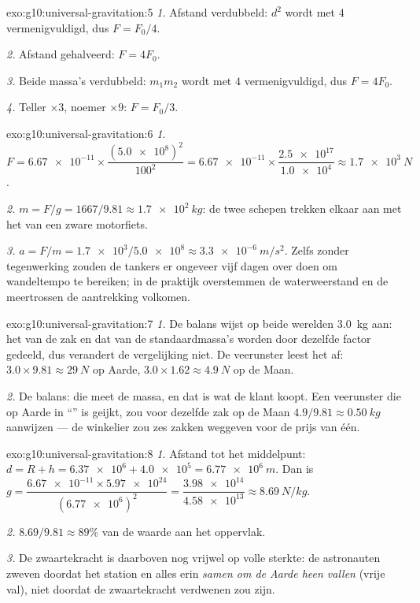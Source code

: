 \begin{solution}{exo:g10:universal-gravitation:5}
\emph{1.} Afstand verdubbeld: $d^2$ wordt met $4$ vermenigvuldigd, dus
$F = F_0/4$.

\emph{2.} Afstand gehalveerd: $F = 4F_0$.

\emph{3.} Beide massa's verdubbeld: $m_1 m_2$ wordt met $4$
vermenigvuldigd, dus $F = 4F_0$.

\emph{4.} Teller $\times 3$, noemer $\times 9$: $F = F_0/3$.
\end{solution}

\begin{solution}{exo:g10:universal-gravitation:6}
\emph{1.} $F = \num{6.67e-11} \times
\dfrac{(\num{5.0e8})^2}{100^2}
= \num{6.67e-11} \times \dfrac{\num{2.5e17}}{\num{1.0e4}}
\approx \qty{1.7e3}{N}$.

\emph{2.} $m = F/g = 1667/9.81 \approx \qty{1.7e2}{kg}$: de twee
schepen trekken elkaar aan met het  van een zware motorfiets.

\emph{3.} $a = F/m = \num{1.7e3}/\num{5.0e8} \approx
\qty{3.3e-6}{m/s^2}$. Zelfs zonder tegenwerking zouden de tankers er
ongeveer vijf dagen over doen om wandeltempo te bereiken; in de praktijk
overstemmen de waterweerstand en de meertrossen de aantrekking
volkomen.
\end{solution}

\begin{solution}{exo:g10:universal-gravitation:7}
\emph{1.} De balans wijst op beide werelden \qty{3.0}{kg} aan: het
 van de zak en dat van de standaardmassa's worden door dezelfde
factor gedeeld, dus verandert de vergelijking niet. De veerunster leest
het  af: $3.0 \times 9.81 \approx \qty{29}{N}$ op Aarde,
$3.0 \times 1.62 \approx \qty{4.9}{N}$ op de Maan.

\emph{2.} De balans: die meet de massa, en dat is wat de klant koopt.
Een veerunster die op Aarde in ``'' is geijkt, zou voor dezelfde
zak op de Maan $4.9/9.81 \approx \qty{0.50}{kg}$ aanwijzen --- de
winkelier zou zes zakken weggeven voor de prijs van één.
\end{solution}

\begin{solution}{exo:g10:universal-gravitation:8}
\emph{1.} Afstand tot het middelpunt:
$d = R + h = \num{6.37e6} + \num{4.0e5} = \qty{6.77e6}{m}$. Dan is
$g = \dfrac{\num{6.67e-11} \times \num{5.97e24}}{(\num{6.77e6})^2}
= \dfrac{\num{3.98e14}}{\num{4.58e13}} \approx \qty{8.69}{N/kg}$.

\emph{2.} $8.69/9.81 \approx 89\%$ van de waarde aan het oppervlak.

\emph{3.} De zwaartekracht is daarboven nog vrijwel op volle sterkte: de
astronauten zweven doordat het station en alles erin \emph{samen om de
Aarde heen vallen} (vrije val), niet doordat de zwaartekracht verdwenen
zou zijn.
\end{solution}

